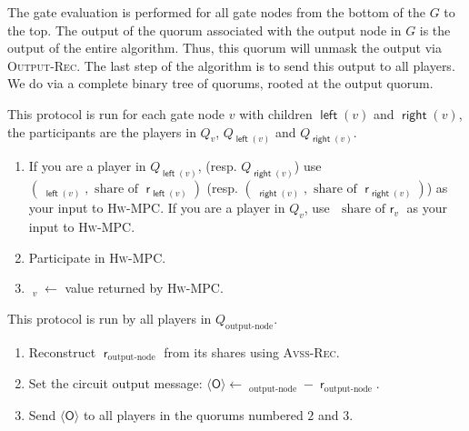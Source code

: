 \documentclass[10pt]{llncs}
\newcommand{\vssRec}{\textsc{Avss-Rec}\xspace}
\newcommand{\hw}{\textsc{Hw-MPC}\xspace}
\newcommand{\gcomp}{\textsc{Gate-Eval}\xspace}
\newcommand{\outrec}{\textsc{Output-Rec}\xspace}
\newcommand{\outval}{\langle\mathsf{O}\rangle\xspace}
\DeclareMathOperator{\mask}{\mathsf{r}}
\DeclareMathOperator{\mv}{\mathsf{\hat{y}}}
\DeclareMathOperator{\lef}{\mathsf{left}}
\DeclareMathOperator{\rit}{\mathsf{right}}
\DeclareMathOperator{\outnodemath}{\text{output-node}}
\begin{document}
   
The gate evaluation is performed for all gate nodes from the bottom of
the $G$ to the top. The output of the quorum associated with the
output node in $G$ is the output of the entire algorithm. Thus, this
quorum will unmask the output via \outrec. The last step of the
algorithm is to send this output to all players. We do via
a complete binary tree of quorums, rooted at the output quorum.


\begin{algorithm} 
\caption{\gcomp}\label{alg:gate}
This protocol is run for each gate node $v$ with children $\lef(v)$ and $\rit(v)$, the 
participants are the players in $Q_v$, $Q_{\lef(v)}$ and $Q_{\rit(v)}$.

\begin{enumerate}
\item If you are a player in  $Q_{\lef(v)}$, (resp. $Q_{\rit(v)}$) use $(\mv_{\lef(v)}, \mbox{ share of } \mask_{\lef(v)})$  (resp. $(\mv_{\rit(v)}, 
\mbox{ share of } \mask_{\rit(v)})$) as your input to \hw. If you are a player in $Q_v$, use $\mbox{ share of } \mask_v$ as your input to \hw.
\item Participate in \hw.
\item $\mv_v \leftarrow $ value returned by \hw.
\end{enumerate}
\end{algorithm}

\begin{algorithm} 
\caption{\outrec}\label{alg:root}
This protocol is run by all players in $Q_{\outnodemath}$.
\begin{enumerate}
\item Reconstruct $\mask_{\outnodemath}$ from its shares using \vssRec. 
\item Set the circuit output message: $\outval \leftarrow \mv_{\outnodemath} - \mask_{\outnodemath}$.
\item Send $\outval$ to all players in the quorums numbered $2$ and $3$.
\end{enumerate}
\end{algorithm}
\end{document}
